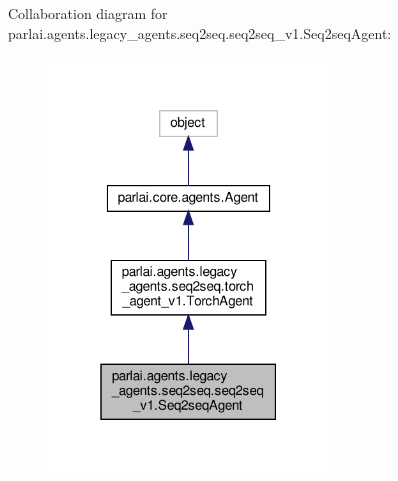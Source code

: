 Collaboration diagram for parlai.\+agents.\+legacy\+\_\+agents.\+seq2seq.\+seq2seq\+\_\+v1.\+Seq2seq\+Agent\+:
\nopagebreak
\begin{figure}[H]
\begin{center}
\leavevmode
\includegraphics[width=211pt]{dc/d76/classparlai_1_1agents_1_1legacy__agents_1_1seq2seq_1_1seq2seq__v1_1_1Seq2seqAgent__coll__graph}
\end{center}
\end{figure}

